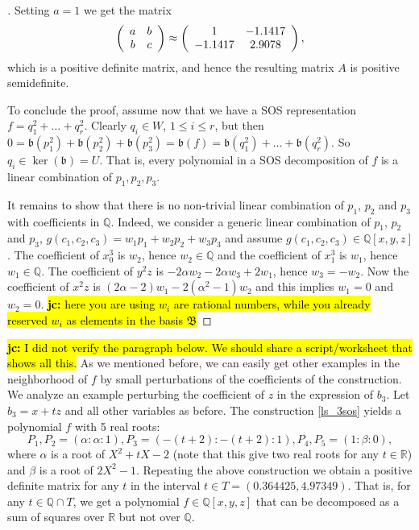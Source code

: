 \documentclass[a4paper,11pt]{amsart}%
\newcommand\jc[1]{\hl{{\bf jc:} #1}}
\newcommand\Q{\mathbb{Q}}
\newcommand\R{\mathbb{R}}
\theoremstyle{definition}
\begin{document}
\begin{proof}[]
Setting $a = 1$ we get the matrix
\[
\left(\begin{array}{c c}
	a & b \\
	b & c \\
\end{array}\right) \approx
\left(\begin{array}{c c}
	1 & -1. 1417 \\
	-1.1417 & 2.9078 \\
\end{array}\right),
\]
which is a positive definite matrix, and hence the resulting matrix $A$ is positive semidefinite.

To conclude the proof, assume now that we have a SOS representation $f = q_1^2 + \dots + q_r^2$. Clearly $q_i \in W$, $1 \le i \le r$, but then $0 = \mathfrak{b}(p_1^2) + \mathfrak{b}(p_2^2) + \mathfrak{b}(p_3^2) = \mathfrak{b}(f) =  \mathfrak{b}(q_1^2) + \dots + \mathfrak{b}(q_r^2)$. So $q_i \in \ker(\mathfrak{b}) = U$. That is, every polynomial in a SOS decomposition of $f$ is a linear combination of $p_1, p_2, p_3$.

It remains to show that there is no non-trivial linear combination of $p_1$, $p_2$ and $p_3$ with coefficients in $\Q$. Indeed, we consider a generic linear combination of $p_1$, $p_2$ and $p_3$, $g(c_1, c_2, c_3) = w_1 p_1 + w_2 p_2 + w_3 p_3$ and assume $g(c_1, c_2, c_3) \in \Q[x,y,z]$. The coefficient of $x_0^3$ is $w_2$, hence $w_2 \in \Q$ and the coefficient of $x_1^3$ is $w_1$, hence $w_1 \in \Q$. The coefficient of $y^2z$ is $-2\alpha w_2-2\alpha w_3+2w_1$, hence $w_3 = -w_2$. Now the coefficient of $x^2 z$ is $(2\alpha-2)w_1-2(\alpha^2-1)w_2$ and this implies $w_1 = 0$ and $w_2 = 0$.
\jc{here you are using $w_i$ are rational numbers, while you already reserved $w_i$ as elements in the basis $\mathfrak{B}$}
\end{proof}

\jc{I did not verify the paragraph below. We should share a script/worksheet that shows all this.}
As we mentioned before, we can easily get other examples in the neighborhood of $f$ by small perturbations of the coefficients of the construction.
We analyze an example perturbing the coefficient of $z$ in the expression of $b_3$. Let $b_3 = x + tz$ and all other variables as before.
The construction \ref{ls_3sos} yields a polynomial $f$ with 5 real roots:
\[
P_1, P_2 = (\alpha : \alpha : 1), P_3 = (-(t+2) : -(t+2) : 1), P_4, P_5 = (1 : \beta : 0),
\]
where $\alpha$ is a root of $X^2+tX-2$ (note that this give two real roots for any $t \in \R$) and $\beta$ is a root of $2X^2-1$.
Repeating the above construction we obtain a positive definite matrix for any $t$ in the interval $t \in T = (0.364425, 4.97349)$. That is, for any $t \in \Q \cap T$, we get a polynomial $f \in \Q[x,y,z]$ that can be decomposed as a sum of squares over $\R$ but not over $\Q$.
\end{document}
